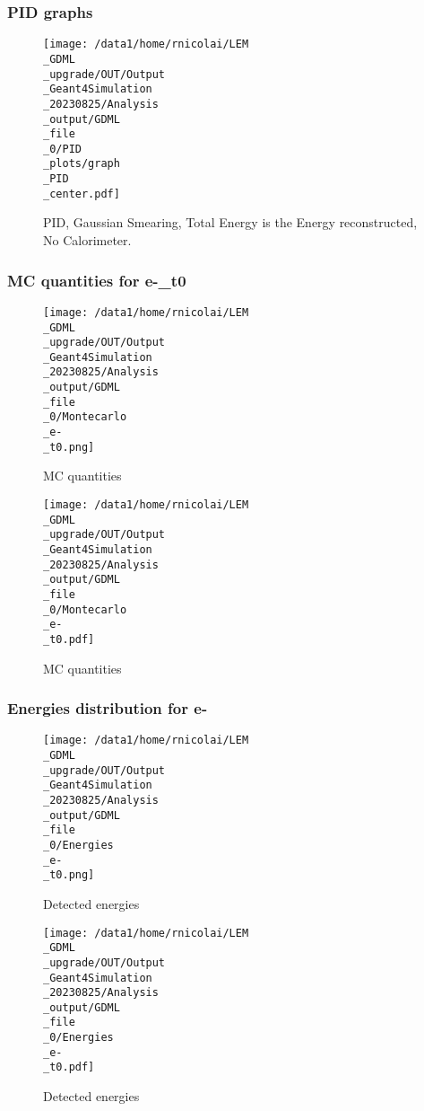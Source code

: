 \documentclass[8pt]{beamer}
\begin{document}
            \begin{frame}
                \frametitle{PID graphs}
            
        \begin{figure}[h]
            \centering
            \texttt{[image: /data1/home/rnicolai/LEM\\\_GDML\\\_upgrade/OUT/Output\\\_Geant4Simulation\\\_20230825/Analysis\\\_output/GDML\\\_file\\\_0/PID\\\_plots/graph\\\_PID\\\_center.pdf]}
            \caption{PID, Gaussian Smearing, Total Energy is the Energy reconstructed, No Calorimeter.}
        \end{figure}
        
            \end{frame}
            
            \begin{frame}
                \frametitle{MC quantities for e-\_t0}
            
        \begin{figure}[h]
            \centering
            \texttt{[image: /data1/home/rnicolai/LEM\\\_GDML\\\_upgrade/OUT/Output\\\_Geant4Simulation\\\_20230825/Analysis\\\_output/GDML\\\_file\\\_0/Montecarlo\\\_e-\\\_t0.png]}
            \caption{MC quantities}
        \end{figure}
        
        \begin{figure}[h]
            \centering
            \texttt{[image: /data1/home/rnicolai/LEM\\\_GDML\\\_upgrade/OUT/Output\\\_Geant4Simulation\\\_20230825/Analysis\\\_output/GDML\\\_file\\\_0/Montecarlo\\\_e-\\\_t0.pdf]}
            \caption{MC quantities}
        \end{figure}
        
            \end{frame}
            
            \begin{frame}
                \frametitle{Energies distribution for e-}
            
        \begin{figure}[h]
            \centering
            \texttt{[image: /data1/home/rnicolai/LEM\\\_GDML\\\_upgrade/OUT/Output\\\_Geant4Simulation\\\_20230825/Analysis\\\_output/GDML\\\_file\\\_0/Energies\\\_e-\\\_t0.png]}
            \caption{Detected energies}
        \end{figure}
        
        \begin{figure}[h]
            \centering
            \texttt{[image: /data1/home/rnicolai/LEM\\\_GDML\\\_upgrade/OUT/Output\\\_Geant4Simulation\\\_20230825/Analysis\\\_output/GDML\\\_file\\\_0/Energies\\\_e-\\\_t0.pdf]}
            \caption{Detected energies}
        \end{figure}
        
            \end{frame}
            
\end{document}
